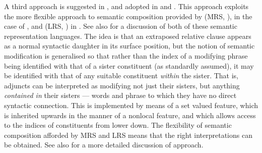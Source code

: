 \documentclass[output=paper
 	        ,biblatex
                ,babelshorthands
                ,newtxmath
                ,draftmode
                ,colorlinks, citecolor=brown
]{langscibook}
\begin{document}
A third approach is suggested in , and adopted in  and
. This approach exploits the more flexible approach to semantic composition provided by  (MRS, \citealt{CFPS2005a}), in the case of , and
 (LRS, \citealt{richtersailer-lrs04}) in
. See also  for a discussion of both of these
  semantic representation languages. The idea is
that an extraposed relative clause appears as a normal syntactic daughter in its surface
position, but the notion of semantic modification is generalised so that rather than the
index of a modifying phrase being identified with that of a sister constituent (as
standardly assumed), it may be identified with that of any suitable constituent
\emph{within} the sister. That is, adjuncts can be interpreted as modifying not just their sisters, but
anything \emph{contained in} their sisters --- words and phrase to which they have no
direct syntactic connection.  This is implemented by means of a set valued
 feature, which is inherited upwards in the manner of a nonlocal
feature, and which allows access to the indices of constituents from lower down. The
flexibility of semantic composition afforded by MRS and LRS means that the right
interpretations can be obtained. See also
 for a more detailed
discussion of  approach.
\end{document}
